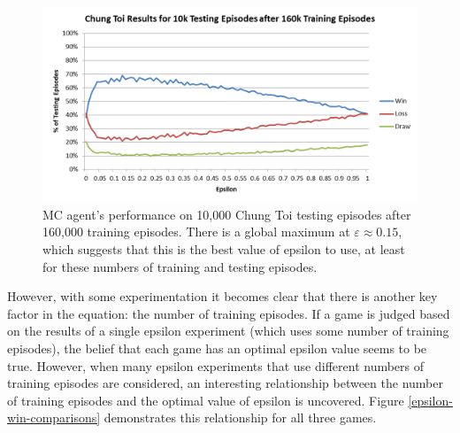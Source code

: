 \documentclass[11pt,a4paper]{report}
\begin{document}
\begin{figure}[htbp]
	\begin{center}
		\includegraphics[width=\linewidth]{ChungToi_EpsilonResults_160kTrainingGames_10kTestingGames.png}
		\caption{MC agent's performance on 10,000 Chung Toi testing episodes after 160,000 training episodes. There is a global maximum at $\varepsilon \approx 0.15$, which suggests that this is the best value of epsilon to use, at least for these numbers of training and testing episodes.}
		\label{chung-toi-epsilon-160ktrain-10ktest}
	\end{center}
\end{figure}

However, with some experimentation it becomes clear that there is another key factor in the equation: the number of training episodes. If a game is judged based on the results of a single epsilon experiment (which uses some number of training episodes), the belief that each game has an optimal epsilon value seems to be true. However, when many epsilon experiments that use different numbers of training episodes are considered, an interesting relationship between the number of training episodes and the optimal value of epsilon is uncovered. Figure \ref{epsilon-win-comparisons} demonstrates this relationship for all three games.
\end{document}
